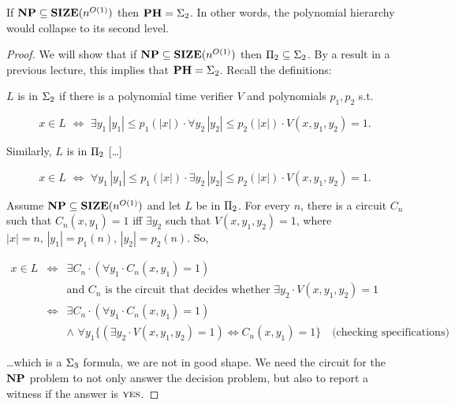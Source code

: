 \begin{Thm}  If $\np \subseteq \size(n^{O(1)})$ then $\ph = \sigmatwo$. In other words, the polynomial hierarchy would collapse to its second level.
\end{Thm}

\begin{proof}
We will show that if $\np \subseteq \size(n^{O(1)})$ then $\pitwo \subseteq \sigmatwo$. By a result in a previous lecture, this implies that $\ph = \Sigma_2$. Recall the definitions:

$L$ is in $\sigmatwo$ if there is a polynomial time verifier $V$ and polynomials $p_1, p_2$ s.t.

\begin{displaymath}
x \in L \,\, \iff \,\, \exists y_1 \, |y_1| \leq p_1(|x|) \cdot \forall y_2 \, |y_2| \leq p_2(|x|) \cdot V(x,y_1,y_2) = 1.
\end{displaymath}

Similarly, $L$ is in $\pitwo$ [\ldots]

\begin{displaymath}
x \in L \,\, \iff \,\, \forall y_1 \, |y_1| \leq p_1(|x|) \cdot \exists y_2 \, |y_2| \leq p_2(|x|) \cdot V(x,y_1,y_2) = 1.
\end{displaymath}

Assume $\np \subseteq \size(n^{O(1)})$ and let $L$ be in $\pitwo$. For every $n$, there is a circuit $C_n$ such that $C_n(x,y_1) = 1$ iff $\exists y_2$ such that $V(x,y_1,y_2) = 1$, where $|x| = n,\, |y_1| = p_1(n),\, |y_2| = p_2(n)$. So,

\begin{displaymath}
\begin{array}{rcl}
x \in L & \iff & \exists C_n \cdot (\forall y_1 \cdot C_n(x,y_1) = 1) \\
& & \textrm{and}\,\, C_n \,\,\textrm{is the circuit that decides whether}\,\, \exists y_2 \cdot V(x,y_1,y_2) = 1 \\
& \iff & \exists C_n \cdot (\forall y_1 \cdot C_n(x,y_1) = 1) \\
& & \land \,\, \forall y_1 \{(\exists y_2 \cdot V(x,y_1,y_2) = 1) \iff C_n(x,y_1) = 1\} \quad \textrm{(checking specifications)}
\end{array}
\end{displaymath}

\ldots which is a $\sigmathree$ formula, we are not in good shape. We need the circuit for the $\np$ problem to not only answer the decision problem, but also to report a witness if the answer is $\mbox{\sc yes}$.


\end{proof}
